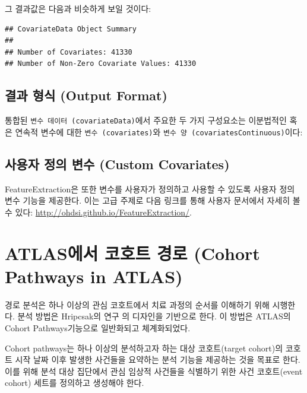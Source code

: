 \documentclass[11pt]{book}
\newenvironment{Shaded}{\begin{snugshade}}{\end{snugshade}}
\newcommand{\OperatorTok}[1]{\textcolor[rgb]{0.81,0.36,0.00}{\textbf{#1}}}
\newcommand{\NormalTok}[1]{#1}
\theoremstyle{definition}
\theoremstyle{definition}
\theoremstyle{definition}
\theoremstyle{remark}
\begin{document}
그 결과값은 다음과 비슷하게 보일 것이다:

\begin{verbatim}
## CovariateData Object Summary 
## 
## Number of Covariates: 41330 
## Number of Non-Zero Covariate Values: 41330
\end{verbatim}

\subsection{결과 형식 (Output Format)}\label{--output-format}

통합된 \texttt{변수\ 데이터\ (covariateData)}에서 주요한 두 가지
구성요소는 이분법적인 혹은 연속적 변수에 대한
\texttt{변수\ (covariates)}와
\texttt{변수\ 양\ (covariatesContinuous)}이다:

\begin{Shaded}
\end{Shaded}

\subsection{사용자 정의 변수 (Custom
Covariates)}\label{---custom-covariates}

FeatureExtraction은 또한 변수를 사용자가 정의하고 사용할 수 있도록
사용자 정의 변수 기능을 제공한다. 이는 고급 주제로 다음 링크를 통해
사용자 문서에서 자세히 볼 수 있다:
\url{http://ohdsi.github.io/FeatureExtraction/}.

\section{ATLAS에서 코호트 경로 (Cohort Pathways in
ATLAS)}\label{atlas---cohort-pathways-in-atlas}

경로 분석은 하나 이상의 관심 코호트에서 치료 과정의 순서를 이해하기 위해
시행한다. 분석 방법은 Hripcsak의 연구 \citep{Hripcsak7329} 의 디자인을
기반으로 한다. 이 방법은 ATLAS의 Cohort Pathways기능으로 일반화되고
체계화되었다.

Cohort pathways는 하나 이상의 분석하고자 하는 대상 코호트(target
cohort)의 코호트 시작 날짜 이후 발생한 사건들을 요약하는 분석 기능을
제공하는 것을 목표로 한다. 이를 위해 분석 대상 집단에서 관심 임상적
사건들을 식별하기 위한 사건 코호트(event cohort) 세트를 정의하고
생성해야 한다.
\end{document}

